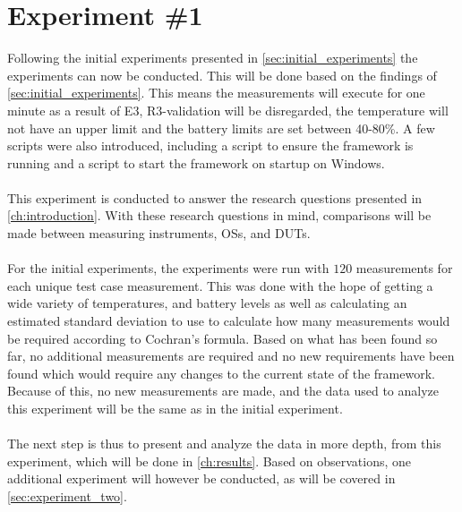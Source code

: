 \section{Experiment \#1}\label{sec:experiment_one}

Following the initial experiments presented in \cref{sec:initial_experiments} the experiments can now be conducted. This will be done based on the findings of \cref{sec:initial_experiments}. This means the measurements will execute for one minute as a result of E3, R3-validation will be disregarded, the temperature will not have an upper limit and the battery limits are set between 40-80\%. A few scripts were also introduced, including a script to ensure the framework is running and a script to start the framework on startup on Windows.

\paragraph*{}
This experiment is conducted to answer the research questions presented in \cref{ch:introduction}. With these research questions in mind, comparisons will be made between measuring instruments, OSs, and DUTs.

\paragraph*{}
For the initial experiments, the experiments were run with $120$ measurements for each unique test case measurement. This was done with the hope of getting a wide variety of temperatures, and battery levels as well as calculating an estimated standard deviation to use to calculate how many measurements would be required according to Cochran's formula. Based on what has been found so far, no additional measurements are required and no new requirements have been found which would require any changes to the current state of the framework. Because of this, no new measurements are made, and the data used to analyze this experiment will be the same as in the initial experiment.

\paragraph*{}
The next step is thus to present and analyze the data in more depth, from this experiment, which will be done in \cref{ch:results}. Based on observations, one additional experiment will however be conducted, as will be covered in \cref{sec:experiment_two}.